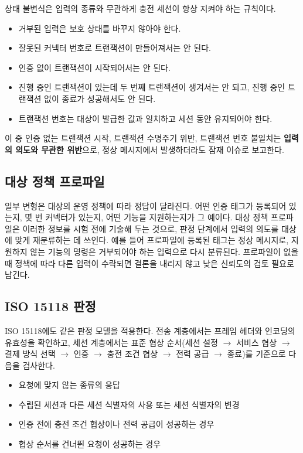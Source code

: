 상태 불변식은 입력의 종류와 무관하게 충전 세션이 항상 지켜야 하는 규칙이다.

\begin{itemize}
    \item 거부된 입력은 보호 상태를 바꾸지 않아야 한다.
    \item 잘못된 커넥터 번호로 트랜잭션이 만들어져서는 안 된다.
    \item 인증 없이 트랜잭션이 시작되어서는 안 된다.
    \item 진행 중인 트랜잭션이 있는데 두 번째 트랜잭션이 생겨서는 안 되고, 진행 중인 트랜잭션 없이 종료가 성공해서도 안 된다.
    \item 트랜잭션 번호는 대상이 발급한 값과 일치하고 세션 동안 유지되어야 한다.
\end{itemize}

이 중 인증 없는 트랜잭션 시작, 트랜잭션 수명주기 위반, 트랜잭션 번호 불일치는 \textbf{입력의 의도와 무관한 위반}으로, 정상 메시지에서 발생하더라도 잠재 이슈로 보고한다.

\subsection{대상 정책 프로파일}

일부 변형은 대상의 운영 정책에 따라 정답이 달라진다. 어떤 인증 태그가 등록되어 있는지, 몇 번 커넥터가 있는지, 어떤 기능을 지원하는지가 그 예이다.
대상 정책 프로파일은 이러한 정보를 시험 전에 기술해 두는 것으로, 판정 단계에서 입력의 의도를 대상에 맞게 재분류하는 데 쓰인다.
예를 들어 프로파일에 등록된 태그는 정상 메시지로, 지원하지 않는 기능의 명령은 거부되어야 하는 입력으로 다시 분류된다.
프로파일이 없을 때 정책에 따라 다른 입력이 수락되면 결론을 내리지 않고 낮은 신뢰도의 검토 필요로 남긴다.

\subsection{ISO 15118 판정}

ISO 15118에도 같은 판정 모델을 적용한다.
전송 계층에서는 프레임 헤더와 인코딩의 유효성을 확인하고, 세션 계층에서는 표준 협상 순서(세션 설정 $\rightarrow$ 서비스 협상 $\rightarrow$ 결제 방식 선택 $\rightarrow$ 인증 $\rightarrow$ 충전 조건 협상 $\rightarrow$ 전력 공급 $\rightarrow$ 종료)를 기준으로 다음을 검사한다.

\begin{itemize}
    \item 요청에 맞지 않는 종류의 응답
    \item 수립된 세션과 다른 세션 식별자의 사용 또는 세션 식별자의 변경
    \item 인증 전에 충전 조건 협상이나 전력 공급이 성공하는 경우
    \item 협상 순서를 건너뛴 요청이 성공하는 경우
\end{itemize}

